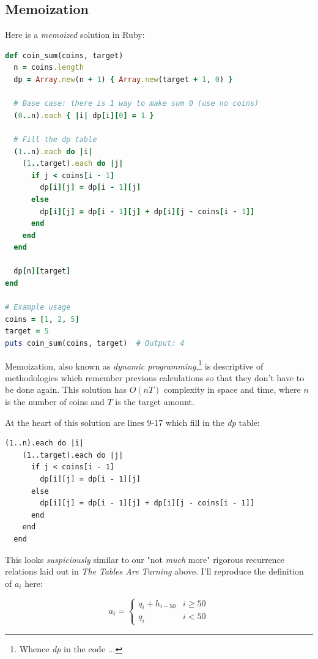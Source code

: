 \subsection{Memoization}
Here is a \textit{memoized} solution in Ruby:
\begin{lstlisting}[language=Ruby,basicstyle=\sffamily\footnotesize]
def coin_sum(coins, target)
  n = coins.length
  dp = Array.new(n + 1) { Array.new(target + 1, 0) }

  # Base case: there is 1 way to make sum 0 (use no coins)
  (0..n).each { |i| dp[i][0] = 1 }

  # Fill the dp table
  (1..n).each do |i|
    (1..target).each do |j|
      if j < coins[i - 1]
        dp[i][j] = dp[i - 1][j]
      else
        dp[i][j] = dp[i - 1][j] + dp[i][j - coins[i - 1]]
      end
    end
  end

  dp[n][target]
end

# Example usage
coins = [1, 2, 5]
target = 5
puts coin_sum(coins, target)  # Output: 4
\end{lstlisting}
Memoization, also known as \textit{dynamic programming},\footnote{Whence \textit{dp} in the code ...} is descriptive of methodologies which remember previous calculations so that they don't have to be done again.  This solution has $O(nT)$ complexity in space and time, where $n$ is the number of coins and $T$ is the target amount.  

At the heart of this solution are lines 9-17 which fill in the \textit{dp} table:
\begin{lstlisting}[firstnumber=9]
  (1..n).each do |i|
    (1..target).each do |j|
      if j < coins[i - 1]
        dp[i][j] = dp[i - 1][j]
      else
        dp[i][j] = dp[i - 1][j] + dp[i][j - coins[i - 1]]
      end
    end
  end
\end{lstlisting}

\noindent This looks \textit{suspiciously} similar to our "not \textit{much} more" rigorous recurrence relations laid out in \textit{The Tables Are Turning} above.  I'll reproduce the definition of $a_i$ here:
\vspace{-1.75em}
\begin{center}
\[
  a_i = \begin{cases}
      q_i + h_{i-50} & i \ge 50 \\
      q_i & i < 50
  \end{cases}
\]
\end{center}


